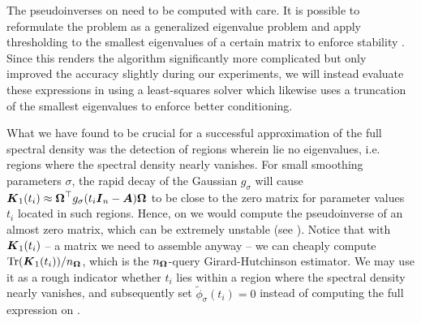 


The pseudoinverses on  need to be computed with care. It is possible to reformulate the problem as a generalized eigenvalue problem and apply thresholding to the smallest eigenvalues of a certain matrix to enforce stability \cite{lin-2017-randomized-estimation, epperly-2022-theory-quantuma}. Since this renders the algorithm significantly more complicated but only improved the accuracy slightly during our experiments, we will instead evaluate these expressions in  using a least-squares solver which likewise uses a truncation of the smallest eigenvalues to enforce better conditioning.

What we have found to be crucial for a successful approximation of the full spectral density was the detection of regions wherein lie no eigenvalues, i.e. regions where the spectral density nearly vanishes. For small smoothing parameters $\sigma$, the rapid decay of the Gaussian $g_{\sigma}$ will cause $\boldsymbol{K}_1(t_i) \approx \boldsymbol{\Omega}^{\top} g_{\sigma}(t_i\boldsymbol{I}_n - \boldsymbol{A}) \boldsymbol{\Omega}$ to be close to the zero matrix for parameter values $t_i$ located in such regions. Hence, on  we would compute the pseudoinverse of an almost zero matrix, which can be extremely unstable (see ). Notice that with $\boldsymbol{K}_1(t_i)$ -- a matrix we need to assemble anyway -- we can cheaply compute $\operatorname{Tr}(\boldsymbol{K}_1(t_i)) / n_{\boldsymbol{\Omega}}$, which is the $n_{\boldsymbol{\Omega}}$-query Girard-Hutchinson estimator. We may use it as a rough indicator whether $t_i$ lies within a region where the spectral density nearly vanishes, and subsequently set $\widetilde{\phi}_{\sigma}(t_i) = 0$ instead of computing the full expression on .

